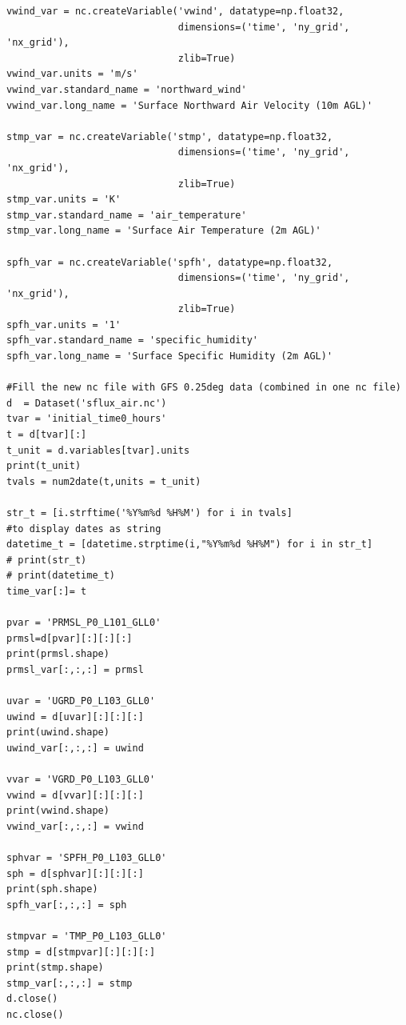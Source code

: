 \documentclass[preprints,briefreport,accept,oneauthor,pdftex]{Definitions/mdpi}
\begin{document}
\begin{verbatim}
vwind_var = nc.createVariable('vwind', datatype=np.float32,
                              dimensions=('time', 'ny_grid', 'nx_grid'),
                              zlib=True)
vwind_var.units = 'm/s'
vwind_var.standard_name = 'northward_wind'
vwind_var.long_name = 'Surface Northward Air Velocity (10m AGL)'

stmp_var = nc.createVariable('stmp', datatype=np.float32,
                              dimensions=('time', 'ny_grid', 'nx_grid'),
                              zlib=True)
stmp_var.units = 'K'
stmp_var.standard_name = 'air_temperature'
stmp_var.long_name = 'Surface Air Temperature (2m AGL)'

spfh_var = nc.createVariable('spfh', datatype=np.float32,
                              dimensions=('time', 'ny_grid', 'nx_grid'),
                              zlib=True)
spfh_var.units = '1'
spfh_var.standard_name = 'specific_humidity'
spfh_var.long_name = 'Surface Specific Humidity (2m AGL)'
    
#Fill the new nc file with GFS 0.25deg data (combined in one nc file)
d  = Dataset('sflux_air.nc')    
tvar = 'initial_time0_hours'
t = d[tvar][:]
t_unit = d.variables[tvar].units
print(t_unit)
tvals = num2date(t,units = t_unit)

str_t = [i.strftime('%Y%m%d %H%M') for i in tvals] 
#to display dates as string
datetime_t = [datetime.strptime(i,"%Y%m%d %H%M") for i in str_t]
# print(str_t)
# print(datetime_t)
time_var[:]= t

pvar = 'PRMSL_P0_L101_GLL0'
prmsl=d[pvar][:][:][:]
print(prmsl.shape)
prmsl_var[:,:,:] = prmsl 

uvar = 'UGRD_P0_L103_GLL0'
uwind = d[uvar][:][:][:]
print(uwind.shape)
uwind_var[:,:,:] = uwind 

vvar = 'VGRD_P0_L103_GLL0'
vwind = d[vvar][:][:][:]
print(vwind.shape)
vwind_var[:,:,:] = vwind 

sphvar = 'SPFH_P0_L103_GLL0'
sph = d[sphvar][:][:][:]
print(sph.shape)
spfh_var[:,:,:] = sph

stmpvar = 'TMP_P0_L103_GLL0'
stmp = d[stmpvar][:][:][:]
print(stmp.shape)
stmp_var[:,:,:] = stmp 
d.close()
nc.close()
\end{verbatim}
\clearpage
\end{document}
